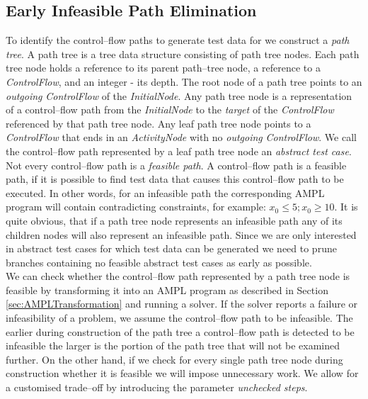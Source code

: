 \documentclass[runningheads,a4paper]{llncs}%
\newcommand{\UMLType}[1]{\textsf{\textit{#1}}} %
\newcommand{\UMLReference}[1]{\textsf{\textit{#1}}} %
\begin{document}
\subsection{Early Infeasible Path Elimination}%
\label{sec:InfeasiblePathElimination}%
To identify the control--flow paths to generate test data for we construct a \emph{path tree}. A path tree is a tree data structure consisting of path tree nodes. Each path tree node holds a reference to its parent path--tree node, a reference to a \UMLType{ControlFlow}, and an integer - its depth. The root node of a path tree points to an \UMLReference{outgoing} \UMLType{ControlFlow} of the \UMLType{InitialNode}. Any path tree node is a representation of a control--flow path from the \UMLType{InitialNode} to the \UMLReference{target} of the \UMLType{ControlFlow} referenced by that path tree node. Any leaf path tree node points to a \UMLType{ControlFlow} that ends in an \UMLType{ActivityNode} with no \UMLReference{outgoing} \UMLType{ControlFlow}. We call the control--flow path represented by a leaf path tree node an \emph{abstract test case}.\\
Not every control--flow path is a \emph{feasible path}. A control--flow path is a feasible path, if it is possible to find test data that causes this control--flow path to be executed. In other words, for an infeasible path the corresponding AMPL program will contain contradicting constraints, for example: $x_0\leq5; x_0\geq10$. It is quite obvious, that if a path tree node represents an infeasible path any of its children nodes will also represent an infeasible path. Since we are only interested in abstract test cases for which test data can be generated we need to prune branches containing no feasible abstract test cases as early as possible.\\
We can check whether the control--flow path represented by a path tree node is feasible by transforming it into an AMPL program as described in Section \ref{sec:AMPLTransformation} and running a solver. If the solver reports a failure or infeasibility of a problem, we assume the control--flow path to be infeasible. The earlier during construction of the path tree a control--flow path is detected to be infeasible the larger is the portion of the path tree that will not be examined further. On the other hand, if we check for every single path tree node during construction whether it is feasible we will impose unnecessary work. We allow for a customised trade--off by introducing the parameter \emph{unchecked steps}.%
\end{document}
